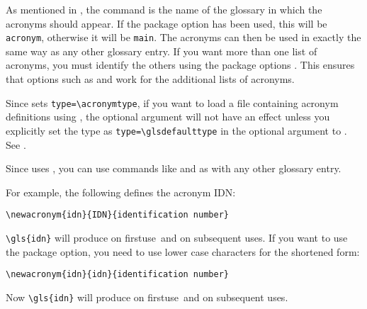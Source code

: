 \documentclass{nlctdoc}
\newcommand*{\firstuse}{\gls{firstuse}}
\begin{document}
As mentioned in , the command
 is the name of the glossary in which the acronyms
should appear. If the  package option has been used,
this will be \texttt{acronym}, otherwise it will be \texttt{main}.
The acronyms can then be used in exactly the same way as any other
glossary entry. If you want more than one list of acronyms, you must
identify the others using the package options .
This ensures that options such as  and
 work for the additional lists of acronyms.

\begin{important}\raggedright
Since  sets \verb|type=\acronymtype|,
if you want to load a file containing acronym definitions using
, the optional argument
 will not have an effect unless you explicitly set the
type as \verb|type=\glsdefaulttype| in the optional argument to
. See .
\end{important}

Since  uses , you can use
commands like  and  as with any other
glossary entry.

For example, the following defines the acronym IDN:
\begin{verbatim}
\newacronym{idn}{IDN}{identification number}
\end{verbatim}
\verb|\gls{idn}| will produce  on
\firstuse\ and  on subsequent uses. If you want to use the
 package option, you need to use lower case
characters for the shortened form:
\begin{verbatim}
\newacronym{idn}{idn}{identification number}
\end{verbatim}
Now \verb|\gls{idn}| will produce  on \firstuse\ and  on subsequent
uses.
\end{document}
